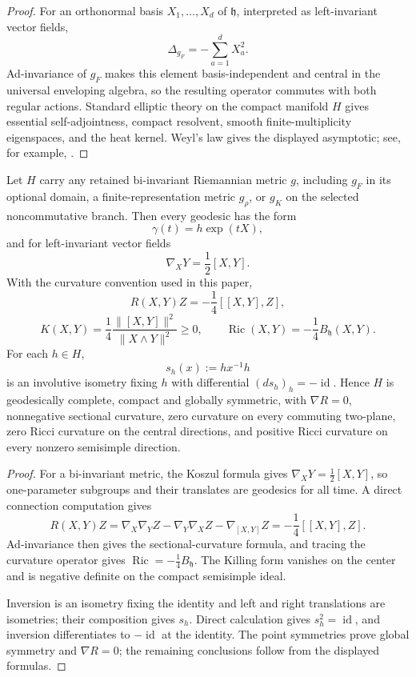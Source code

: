 \documentclass[11pt,a4paper]{article}
\begin{document}
\begin{proof}
For an orthonormal basis \(X_1,\ldots,X_d\) of \(\mathfrak h\), interpreted as
left-invariant vector fields,
\[
 \Delta_{g_F}=-\sum_{a=1}^dX_a^2.
\]
Ad-invariance of \(g_F\) makes this element basis-independent and central in
the universal enveloping algebra, so the resulting operator commutes with
both regular actions.  Standard elliptic theory on the compact manifold \(H\)
gives essential self-adjointness, compact resolvent, smooth finite-multiplicity
eigenspaces, and the heat kernel.  Weyl's law gives the displayed asymptotic;
see, for example, \cite{berline1992heat,Vassilevich2003HeatKernel}.
\end{proof}

\begin{theorem}
\label{p2:thm:bi-invariant-global-symmetry}
Let \(H\) carry any retained bi-invariant Riemannian metric \(g\), including
\(g_F\) in its optional domain, a finite-representation metric \(g_\rho\),
or \(g_K\) on the selected noncommutative branch.  Then every geodesic has
the form
\[
 \gamma(t)=h\exp(tX),
\]
and for left-invariant vector fields
\[
 \nabla_XY=\frac12[X,Y].
\]
With the curvature convention used in this paper,
\[
 R(X,Y)Z=-\frac14[[X,Y],Z],
\]
\[
 K(X,Y)=\frac14
 \frac{\|[X,Y]\|^2}{\|X\wedge Y\|^2}\ge0,
\qquad
 \operatorname{Ric}(X,Y)=-\frac14B_{\mathfrak h}(X,Y).
\]
For each \(h\in H\),
\[
 s_h(x):=hx^{-1}h
\]
is an involutive isometry fixing \(h\) with differential
\((ds_h)_h=-\operatorname{id}\).  Hence \(H\) is geodesically complete,
compact and globally symmetric, with \(\nabla R=0\), nonnegative sectional
curvature, zero curvature on every commuting two-plane, zero Ricci curvature
on the central directions, and positive Ricci curvature on every nonzero
semisimple direction.
\end{theorem}

\begin{proof}
For a bi-invariant metric, the Koszul formula gives
\(\nabla_XY=\frac12[X,Y]\), so one-parameter subgroups and their translates
are geodesics for all time.  A direct connection computation gives
\[
 R(X,Y)Z
 =\nabla_X\nabla_YZ-\nabla_Y\nabla_XZ-\nabla_{[X,Y]}Z
 =-\frac14[[X,Y],Z].
\]
Ad-invariance then gives the sectional-curvature formula, and tracing the
curvature operator gives
\(\operatorname{Ric}=-\frac14B_{\mathfrak h}\).
The Killing form vanishes on the center and is negative definite on the
compact semisimple ideal.

Inversion is an isometry fixing the identity and left and right translations
are isometries; their composition gives \(s_h\).  Direct calculation gives
\(s_h^2=\operatorname{id}\), and inversion differentiates to
\(-\operatorname{id}\) at the identity.  The point symmetries prove global
symmetry and \(\nabla R=0\); the remaining conclusions follow from the
displayed formulas.
\end{proof}
\end{document}
